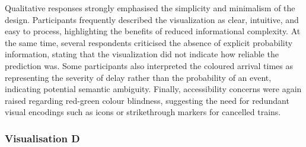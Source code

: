 \documentclass[final,journal,a4paper]{IEEEtran}
\begin{document}
Qualitative responses strongly emphasised the simplicity and minimalism of the design. Participants frequently described the visualization as clear, intuitive, and easy to process, highlighting the benefits of reduced informational complexity. At the same time, several respondents criticised the absence of explicit probability information, stating that the visualization did not indicate how reliable the prediction was. Some participants also interpreted the coloured arrival times as representing the severity of delay rather than the probability of an event, indicating potential semantic ambiguity. Finally, accessibility concerns were again raised regarding red-green colour blindness, suggesting the need for redundant visual encodings such as icons or strikethrough markers for cancelled trains.

\subsubsection{Visualisation D}
\end{document}
